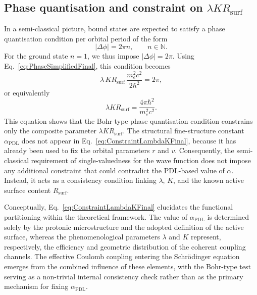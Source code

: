 \documentclass[11pt,a4paper]{article}
\begin{document}
\subsection{Phase quantisation and constraint on \texorpdfstring{\(\lambda K R_{\mathrm{surf}}\)}{lambda K R\_surf}}

In a semi-classical picture, bound states are expected to satisfy a phase quantisation condition per orbital period of the form
\begin{equation}
|\Delta \phi| = 2\pi n, 
\qquad 
n \in \mathbb{N}.
\end{equation}
For the ground state \(n=1\), we thus impose \(|\Delta \phi| = 2\pi\). Using Eq.~\eqref{eq:PhaseSimplifiedFinal}, this condition becomes
\begin{equation}
\lambda \,K R_{\mathrm{surf}}\,\frac{m_e^{2} c^{2}}{2\hbar^{2}} = 2\pi,
\end{equation}
or equivalently
\begin{equation}
\lambda K R_{\mathrm{surf}} = \frac{4\pi \hbar^{2}}{m_e^{2} c^{2}}.
\label{eq:ConstraintLambdaKFinal}
\end{equation}
This equation shows that the Bohr-type phase quantisation condition constrains only the composite parameter \(\lambda K R_{\mathrm{surf}}\). The structural fine-structure constant \(\alpha_{\mathrm{PDL}}\) does not appear in Eq.~\eqref{eq:ConstraintLambdaKFinal}, because it has already been used to fix the orbital parameters \(r\) and \(v\). Consequently, the semi-classical requirement of single-valuedness for the wave function does not impose any additional constraint that could contradict the PDL-based value of \(\alpha\). Instead, it acts as a consistency condition linking \(\lambda\), \(K\), and the known active surface content \(R_{\mathrm{surf}}\).

Conceptually, Eq.~\eqref{eq:ConstraintLambdaKFinal} elucidates the functional partitioning within the theoretical framework. The value of \(\alpha_{\mathrm{PDL}}\) is determined solely by the protonic microstructure and the adopted definition of the active surface, whereas the phenomenological parameters \(\lambda\) and \(K\) represent, respectively, the efficiency and geometric distribution of the coherent coupling channels. The effective Coulomb coupling entering the Schr\"odinger equation emerges from the combined influence of these elements, with the Bohr-type test serving as a non-trivial internal consistency check rather than as the primary mechanism for fixing \(\alpha_{\mathrm{PDL}}\).
\end{document}
